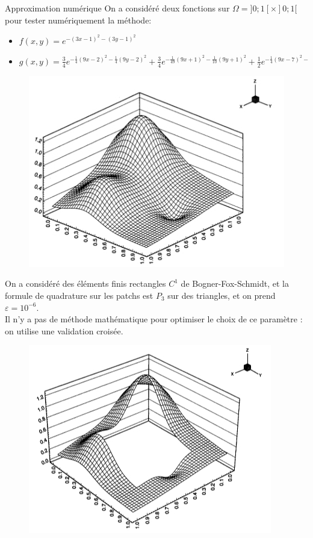 \documentclass[final]{beamer}
\newlength{\onecolwid}
\newlength{\twocolwid}
\begin{document}
\begin{frame}[t]
\begin{columns}[t]
\begin{column}{\twocolwid}
\begin{columns}[t,totalwidth=\twocolwid]
\begin{column}{\onecolwid}
\begin{block}{Approximation numérique}
On a considéré deux fonctions sur $\Omega=]0;1[\times]0;1[$ pour tester numériquement la méthode:
\begin{itemize}
	\item $f(x,y)=e^{-(3x-1)^2-(3y-1)^2}$
	\item $g(x,y)=\frac{3}{4}e^{-\frac{1}{4}(9x-2)^2-\frac{1}{4}(9y-2)^2} + \frac{3}{4}e^{-\frac{1}{49}(9x+1)^2-\frac{1}{10}(9y+1)^2}+\frac{1}{2}e^{-\frac{1}{4}(9x-7)^2-\frac{1}{4}(9y-3)^2} - \frac{1}{5}e^{-(9x-4)^2-(9y+7)^2}$
\end{itemize}
\begin{figure}[!h]
\includegraphics[scale=1.5]{CGOUT1.jpg}
\end{figure}
On a considéré des éléments finis rectangles $C^1$ de Bogner-Fox-Schmidt, et la formule de quadrature sur les patchs est $P_3$ sur des triangles, et on prend $\varepsilon=10^{-6}$.\\
Il n'y a pas de méthode mathématique pour optimiser le choix de ce paramètre : on utilise une validation croisée.\\
\begin{figure}[!h]
\includegraphics[scale=1.4]{CGOUT2.jpg}

\end{figure}
\end{block}
\end{column}
\end{columns}
\end{column}
\end{columns}
\end{frame}
\end{document}
